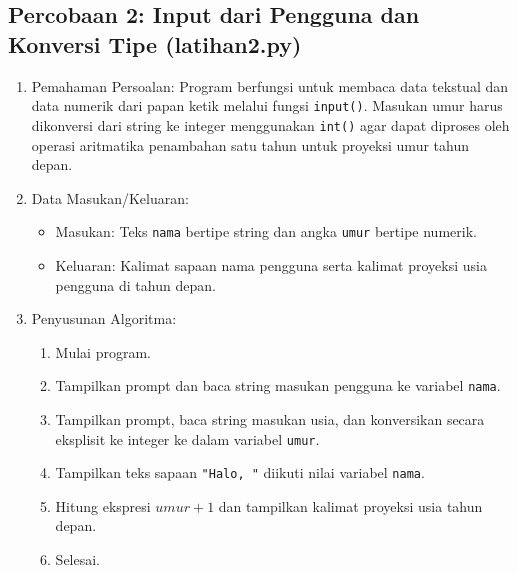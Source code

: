 \documentclass[12pt,a4paper]{article}
\begin{document}
\subsection{Percobaan 2: Input dari Pengguna dan Konversi Tipe (latihan2.py)}
\begin{enumerate}
    \item Pemahaman Persoalan: Program berfungsi untuk membaca data tekstual dan data numerik dari papan ketik melalui fungsi \texttt{input()}. Masukan umur harus dikonversi dari string ke integer menggunakan \texttt{int()} agar dapat diproses oleh operasi aritmatika penambahan satu tahun untuk proyeksi umur tahun depan.
    \item Data Masukan/Keluaran:
    \begin{itemize}
        \item Masukan: Teks \texttt{nama} bertipe string dan angka \texttt{umur} bertipe numerik.
        \item Keluaran: Kalimat sapaan nama pengguna serta kalimat proyeksi usia pengguna di tahun depan.
    \end{itemize}
    \item Penyusunan Algoritma:
    \begin{enumerate}[label=\alph*.]
        \item Mulai program.
        \item Tampilkan prompt dan baca string masukan pengguna ke variabel \texttt{nama}.
        \item Tampilkan prompt, baca string masukan usia, dan konversikan secara eksplisit ke integer ke dalam variabel \texttt{umur}.
        \item Tampilkan teks sapaan \texttt{"Halo, "} diikuti nilai variabel \texttt{nama}.
        \item Hitung ekspresi $umur + 1$ dan tampilkan kalimat proyeksi usia tahun depan.
        \item Selesai.
    \end{enumerate}
\end{enumerate}
\end{document}
